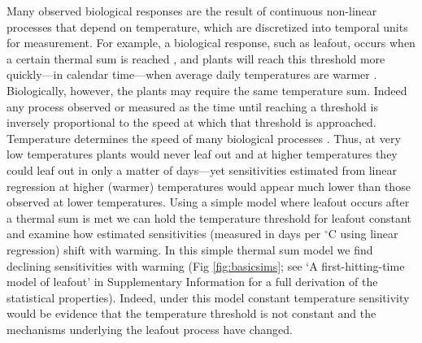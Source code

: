 \documentclass[11pt,letter]{article}
\begin{document}
Many observed biological responses are the result of continuous non-linear processes that depend on temperature, which are discretized into temporal units for measurement. For example, a biological response, such as leafout, occurs when a certain thermal sum is reached \citep{dij1956,lindsey1956}, and plants will reach this threshold more quickly---in calendar time---when average daily temperatures are warmer \citep[Fig. \ref{fig:ospreewsims},][]{kramer2012book}. 
Biologically, however, the plants may require the same temperature sum. Indeed any process observed or measured as the time until reaching a threshold is inversely proportional to the speed at which that threshold is approached. \\

Temperature determines the speed of many biological processes \citep{bonan1992,hofmann2010}. Thus, at very low temperatures plants would never leaf out and at higher temperatures they could leaf out in only a matter of days---yet sensitivities estimated from linear regression at higher (warmer) temperatures would appear much lower than those observed at lower temperatures. Using a simple model where leafout occurs after a thermal sum is met we can hold the temperature threshold for leafout constant \citep{Hunter:1992jw,zohner2020gcb} and examine how estimated sensitivities (measured in days per $^{\circ}$C using linear regression) shift with warming. In this simple thermal sum model \citep[which we argue is the null model for studies of biological events across different temperatures, Fig. \ref{fig:ospreewsims} and][]{dij1956,lindsey1956,zohner2020gcb} we find declining sensitivities with warming (Fig \ref{fig:basicsims}; see `A first-hitting-time model of leafout' in Supplementary Information for a full derivation of the statistical properties). Indeed, under this model constant temperature sensitivity would be evidence that the temperature threshold is not constant and the mechanisms underlying the leafout process have changed. \\
\end{document}
